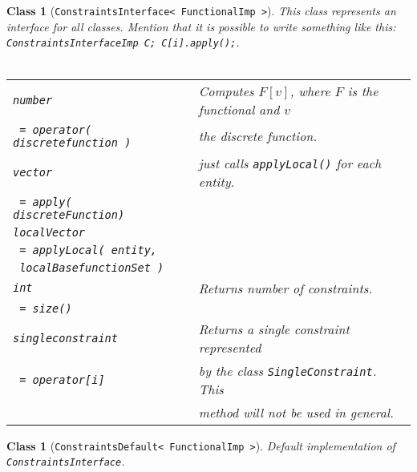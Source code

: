 \documentclass[a4paper,11pt]{article}
\numberwithin{equation}{section}
\newtheorem{class}[definition]{Class}
\newcommand{\theoremEndLine}{\hspace{1mm}}
\newcommand{\CodeT}[1]{\textnormal{\texttt{#1}}}
\begin{document}
	\begin{class}[\CodeT{ConstraintsInterface< FunctionalImp >}]
		This class represents an interface for all classes. Mention that it is possible to write something like this: \CodeT{ConstraintsInterfaceImp C; C[i].apply();}.
		\\\\
      \begin{tabular}{|l|l|}
        \hline
        \CodeT{number} & Computes $F[v]$, where $F$ is the functional and $v$\\
        \CodeT{ = operator( discretefunction )} & the discrete function.\\
        \hline
				\CodeT{vector} & just calls \CodeT{applyLocal()} for each entity.\\
				\CodeT{ = apply( discreteFunction) } & \\
				\hline
        \CodeT{localVector} & \\
        \CodeT{ = applyLocal( entity,} & \\
        \CodeT{ localBasefunctionSet )}  & \\
        \hline
				\CodeT{int} & Returns number of constraints. \\
				\CodeT{ = size()} & \\
				\hline
				\CodeT{singleconstraint} & Returns a single constraint represented\\
				\CodeT{ = operator[i]} & by the class \CodeT{SingleConstraint}. This \\
					& method will not be used in general.\\
				\hline
      \end{tabular}
    \end{class}\theoremEndLine

	\begin{class}[\CodeT{ConstraintsDefault< FunctionalImp >}]
		Default implementation of \CodeT{ConstraintsInterface}.
  \end{class}\theoremEndLine
\end{document}
